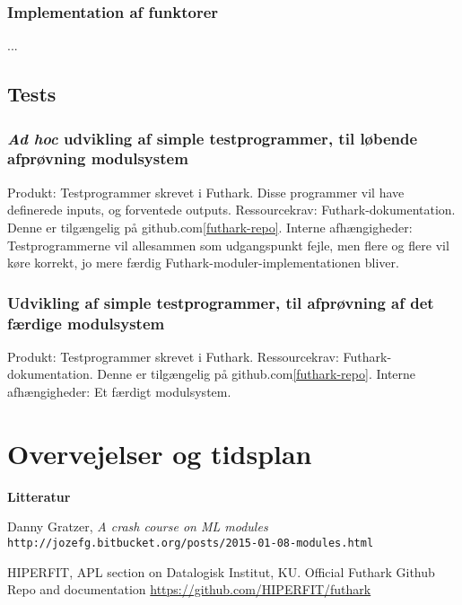 \documentclass[12pt]{article}
\begin{document}
\subsubsection{Implementation af funktorer}
...

\subsection{Tests}
\subsubsection{\textit{Ad hoc} udvikling af simple testprogrammer, til løbende afprøvning 
modulsystem}
Produkt: Testprogrammer skrevet i Futhark. Disse programmer vil have definerede
inputs, og forventede outputs.
Ressourcekrav: Futhark-dokumentation. Denne er tilgængelig på github.com\ref{futhark-repo}.
Interne afhængigheder: Testprogrammerne vil allesammen som udgangspunkt fejle,
men flere og flere vil køre korrekt, jo mere færdig Futhark-moduler-implementationen bliver.
\subsubsection{Udvikling af simple testprogrammer, til afprøvning 
af det færdige modulsystem}
Produkt: Testprogrammer skrevet i Futhark.
Ressourcekrav: Futhark-dokumentation. Denne er tilgængelig på github.com\ref{futhark-repo}.
Interne afhængigheder: Et færdigt modulsystem.
\section{Overvejelser og tidsplan}
\textbf{Litteratur}
\begin{thebibliography}
Danny Gratzer, \textit{A crash course on ML modules}
\texttt{http://jozefg.bitbucket.org/posts/2015-01-08-modules.html}

HIPERFIT, APL section on Datalogisk Institut, KU.
Official Futhark Github Repo and documentation
\url{https://github.com/HIPERFIT/futhark}
\end{thebibliography}
\end{document}
